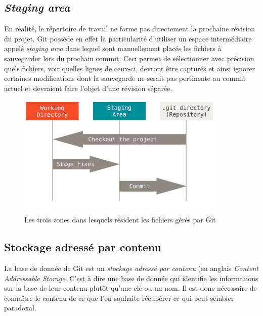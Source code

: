 \documentclass[11pt,a4paper]{article}
\begin{document}
\subsection{\textit{Staging area}}

En réalité, le répertoire de travail ne forme pas directement la prochaine révision du projet.
Git possède en effet la particularité d'utiliser un espace intermédiaire appelé \textit{staging area} dans lequel sont manuellement placés les fichiers à sauvegarder lors du prochain commit. Ceci permet de sélectionner avec précision quels fichiers, voir quelles lignes de ceux-ci, devront être capturés et ainsi ignorer certaines modifications dont la sauvegarde ne serait pas pertinente au commit actuel et devraient faire l'objet d'une révision séparée.


\begin{figure}[ht]
\begin{center}
\includegraphics[width=10cm]{img_areas} \cite{progit}
\caption{Les trois zones dans lesquels résident les fichiers gérés par Git}
\end{center}
\end{figure}

\vspace{-4mm}
\subsection{Stockage adressé par contenu}

La base de donnée de Git est un \textit{stockage adressé par contenu} (en anglais \textit{Content Addressable Storage}.
C'est à dire une base de donnée qui identifie les informations sur la base de leur contenu plutôt qu'une clé ou un nom.
Il est donc nécessaire de connaître le contenu de ce que l'on souhaite récupérer ce qui peut sembler paradoxal.
\end{document}
